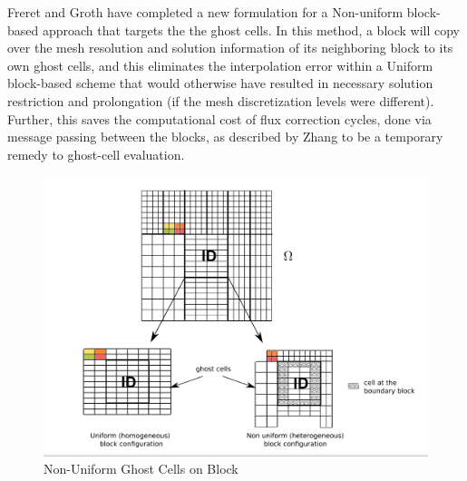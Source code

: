 \begin{enumerate}
Freret and Groth \cite{Freret:2015} have completed a new formulation for a Non-uniform block-based approach that targets the the ghost cells. In this method, a block will copy over the mesh resolution and solution information of its neighboring block to its own ghost cells, and this eliminates the interpolation error within a Uniform block-based scheme that would otherwise have resulted in necessary solution restriction and prolongation (if the mesh discretization levels were different). Further, this saves the computational cost of flux correction cycles, done via message passing between the blocks, as described by Zhang to be a temporary remedy to ghost-cell evaluation.\cite{Zhang:2011a}

\begin{figure}
    \vspace{0.2cm}
    \begin{center}
      \includegraphics[height=0.35\textwidth]{./figs/Non-UniformBlock.png}
    \end{center}
    \caption{Non-Uniform Ghost Cells on Block \cite{Freret:2015}}  
    \vspace{0.2cm}
\end{figure}

\end{enumerate}
